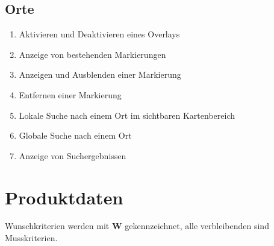 \documentclass[10pt]{scrreprt}
\newcommand{\sfbf}[1]{\textbf{\sffamily #1}}
\newcommand{\W}{\sfbf{W}}
\newcommand{\ziel}[1]{{\fontsize{9.5}{11}\textsf{/#1/}}}
\newcommand{\ziellabel}{Z}
\newcommand{\muss}{\renewcommand{\labelenumi}{\textbf{\ziel{\ziellabel\numprint{\theenumi}0}}}}
\newcommand{\wunsch}{\renewcommand{\labelenumi}{\textbf{\ziel{\ziellabel\numprint{\theenumi}0W}}}}
\begin{document}
\section{Orte}
\begin{enumerate}[leftmargin=2.2cm,resume]
\item Aktivieren und Deaktivieren eines Overlays
\wunsch
\item Anzeige von bestehenden Markierungen
\item Anzeigen und Ausblenden einer Markierung
\item Entfernen einer Markierung
\item Lokale Suche nach einem Ort im sichtbaren Kartenbereich
\item Globale Suche nach einem Ort
\item Anzeige von Suchergebnissen
\end{enumerate}


\chapter{Produktdaten}

\renewcommand{\ziellabel}{D}
\muss

Wunschkriterien werden mit {\W } gekennzeichnet, alle verbleibenden sind Musskriterien.\\

\vspace{5mm}
\end{document}
